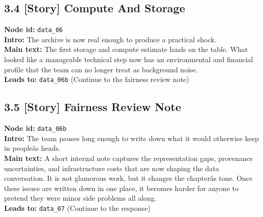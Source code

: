 \documentclass[11pt]{article}
\begin{document}
\subsection*{3.4 [Story] Compute And Storage}
\textbf{Node id:} \texttt{data\_06}\\
\textbf{Intro:} The archive is now real enough to produce a practical shock.\\
\textbf{Main text:} The first storage and compute estimate lands on the table. What looked like a manageable technical step now has an environmental and financial profile that the team can no longer treat as background noise.\\
\textbf{Leads to:} \texttt{data\_06b} (Continue to the fairness review note)\\
\subsection*{3.5 [Story] Fairness Review Note}
\textbf{Node id:} \texttt{data\_06b}\\
\textbf{Intro:} The team pauses long enough to write down what it would otherwise keep in peopleâs heads.\\
\textbf{Main text:} A short internal note captures the representation gaps, provenance uncertainties, and infrastructure costs that are now shaping the data conversation. It is not glamorous work, but it changes the chapterâs tone. Once these issues are written down in one place, it becomes harder for anyone to pretend they were minor side problems all along.\\
\textbf{Leads to:} \texttt{data\_07} (Continue to the response)\\
\end{document}
